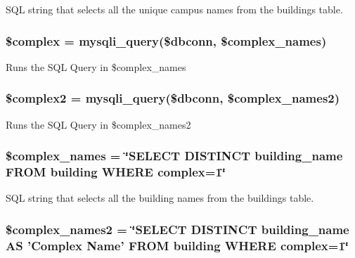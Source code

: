 \-S\-Q\-L string that selects all the unique campus names from the buildings table. \hypertarget{settings_8php_a25ec02534214977602829622b78b5d78}{
\subsubsection[{\$complex}]{\setlength{\rightskip}{0pt plus 5cm}\$complex = mysqli\-\_\-query(\$dbconn, \$complex\-\_\-names)}}\label{settings_8php_a25ec02534214977602829622b78b5d78}
\-Runs the \-S\-Q\-L \-Query in \$complex\-\_\-names \hypertarget{settings_8php_a0f1e56ea9ecb95074e133ed789db0d70}{
\subsubsection[{\$complex2}]{\setlength{\rightskip}{0pt plus 5cm}\$complex2 = mysqli\-\_\-query(\$dbconn, \$complex\-\_\-names2)}}\label{settings_8php_a0f1e56ea9ecb95074e133ed789db0d70}
\-Runs the \-S\-Q\-L \-Query in \$complex\-\_\-names2 \hypertarget{settings_8php_a35bd04dbb758885cf1cdf47f4d9d338d}{
\subsubsection[{\$complex\-\_\-names}]{\setlength{\rightskip}{0pt plus 5cm}\$complex\-\_\-names = \char`\"{}\-S\-E\-L\-E\-C\-T \-D\-I\-S\-T\-I\-N\-C\-T building\-\_\-name \-F\-R\-O\-M building \-W\-H\-E\-R\-E complex=1\char`\"{}}}\label{settings_8php_a35bd04dbb758885cf1cdf47f4d9d338d}
\-S\-Q\-L string that selects all the building names from the buildings table. \hypertarget{settings_8php_a1b9130a7b15f9d24c6c7b9f180f58c35}{
\subsubsection[{\$complex\-\_\-names2}]{\setlength{\rightskip}{0pt plus 5cm}\$complex\-\_\-names2 = \char`\"{}\-S\-E\-L\-E\-C\-T \-D\-I\-S\-T\-I\-N\-C\-T building\-\_\-name \-A\-S '\-Complex \-Name' \-F\-R\-O\-M building \-W\-H\-E\-R\-E complex=1\char`\"{}}}\label{settings_8php_a1b9130a7b15f9d24c6c7b9f180f58c35}
